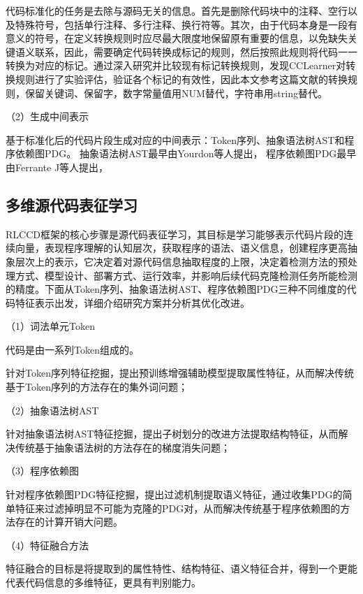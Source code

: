 代码标准化的任务是去除与源码无关的信息。首先是删除代码块中的注释、空行以及特殊符号，包括单行注释、多行注释、换行符等。其次，由于代码本身是一段有意义的符号，在定义转换规则时应尽最大限度地保留原有重要的信息，以免缺失关键语义联系，因此，需要确定代码转换成标记的规则，然后按照此规则将代码一一转换为对应的标记。通过深入研究并比较现有标记转换规则，发现CCLearner\cite{10.1145/1287624.1287634}对转换规则进行了实验评估，验证各个标记的有效性，因此本文参考这篇文献的转换规则，保留关键词、保留字，数字常量值用NUM替代，字符串用string替代。

（2）生成中间表示

基于标准化后的代码片段生成对应的中间表示：Token序列、抽象语法树AST和程序依赖图PDG。
抽象语法树AST最早由Yourdon等人\cite{10.1145/1499949.1499997}提出，
程序依赖图PDG最早由Ferrante J等人\cite{10.1145/24039.24041}提出，

\subsection{多维源代码表征学习}
\label{subsec:Representation}
RLCCD框架的核心步骤是源代码表征学习，其目标是学习能够表示代码片段的连续向量，表现程序理解的认知层次，获取程序的语法、语义信息，创建程序更高抽象层次上的表示，它决定着对源代码信息抽取程度的上限，决定着检测方法的预处理方式、模型设计、部署方式、运行效率，并影响后续代码克隆检测任务所能检测的精度。下面从Token序列、抽象语法树AST、程序依赖图PDG三种不同维度的代码特征表示出发，详细介绍研究方案并分析其优化改进。

（1）词法单元Token

代码是由一系列Token组成的。

针对Token序列特征挖掘，提出预训练增强辅助模型提取属性特征，从而解决传统基于Token序列的方法存在的集外词问题；

（2）抽象语法树AST

针对抽象语法树AST特征挖掘，提出子树划分的改进方法提取结构特征，从而解决传统基于抽象语法树的方法存在的梯度消失问题；

（3）程序依赖图

针对程序依赖图PDG特征挖掘，提出过滤机制提取语义特征，通过收集PDG的简单特征来过滤掉明显不可能为克隆的PDG对，从而解决传统基于程序依赖图的方法存在的计算开销大问题。

（4）特征融合方法

特征融合的目标是将提取到的属性特性、结构特征、语义特征合并，得到一个更能代表代码信息的多维特征，更具有判别能力。


